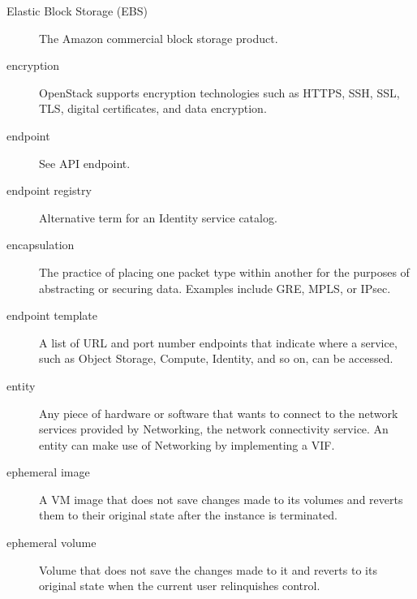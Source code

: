 \documentclass[letterpaper,10pt,english]{sphinxmanual}
\begin{document}
\begin{description}
\item[{Elastic Block Storage (EBS)}] \leavevmode{}\label{_source/glossary:term-elastic-block-storage-ebs}
The Amazon commercial block storage product.

\item[{encryption}] \leavevmode{}\label{_source/glossary:term-encryption}
OpenStack supports encryption technologies such as HTTPS, SSH,
SSL, TLS, digital certificates, and data encryption.

\item[{endpoint}] \leavevmode{}\label{_source/glossary:term-endpoint}
See API endpoint.

\item[{endpoint registry}] \leavevmode{}\label{_source/glossary:term-endpoint-registry}
Alternative term for an Identity service catalog.

\item[{encapsulation}] \leavevmode{}\label{_source/glossary:term-encapsulation}
The practice of placing one packet type within another for
the purposes of abstracting or securing data. Examples
include GRE, MPLS, or IPsec.

\item[{endpoint template}] \leavevmode{}\label{_source/glossary:term-endpoint-template}
A list of URL and port number endpoints that indicate where a
service, such as Object Storage, Compute, Identity, and so on, can be
accessed.

\item[{entity}] \leavevmode{}\label{_source/glossary:term-entity}
Any piece of hardware or software that wants to connect to the
network services provided by Networking, the network connectivity
service. An entity can make use of Networking by implementing a
VIF.

\item[{ephemeral image}] \leavevmode{}\label{_source/glossary:term-ephemeral-image}
A VM image that does not save changes made to its volumes and
reverts them to their original state after the instance is
terminated.

\item[{ephemeral volume}] \leavevmode{}\label{_source/glossary:term-ephemeral-volume}
Volume that does not save the changes made to it and reverts to
its original state when the current user relinquishes control.


\end{description}
\end{document}
